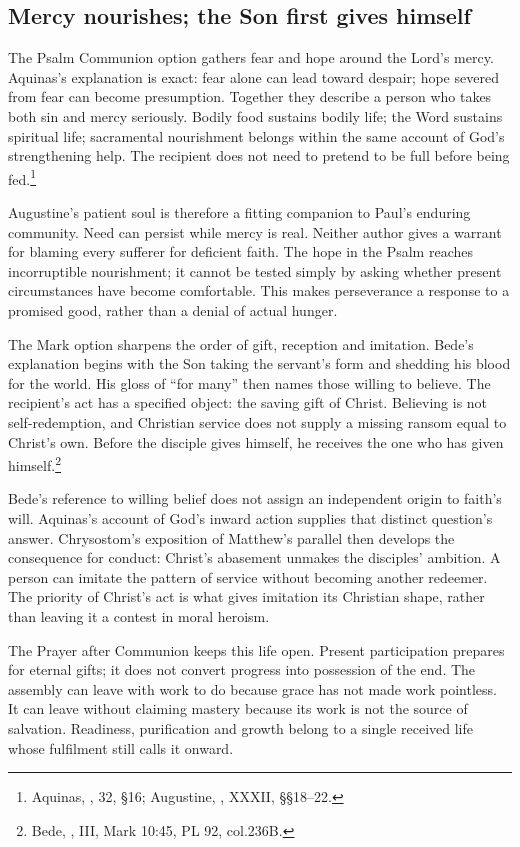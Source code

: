 \subsection{Mercy nourishes; the Son first gives himself}
The Psalm Communion option gathers fear and hope around the Lord's mercy. Aquinas's explanation is exact: fear alone can lead toward despair; hope severed from fear can become presumption. Together they describe a person who takes both sin and mercy seriously. Bodily food sustains bodily life; the Word sustains spiritual life; sacramental nourishment belongs within the same account of God's strengthening help. The recipient does not need to pretend to be full before being fed.\footnote{Aquinas, , 32, §16; Augustine, , XXXII, §§18--22.}

Augustine's patient soul is therefore a fitting companion to Paul's enduring community. Need can persist while mercy is real. Neither author gives a warrant for blaming every sufferer for deficient faith. The hope in the Psalm reaches incorruptible nourishment; it cannot be tested simply by asking whether present circumstances have become comfortable. This makes perseverance a response to a promised good, rather than a denial of actual hunger.

The Mark option sharpens the order of gift, reception and imitation. Bede's explanation begins with the Son taking the servant's form and shedding his blood for the world. His gloss of ``for many'' then names those willing to believe. The recipient's act has a specified object: the saving gift of Christ. Believing is not self-redemption, and Christian service does not supply a missing ransom equal to Christ's own. Before the disciple gives himself, he receives the one who has given himself.\footnote{Bede, , III, Mark 10:45, PL 92, col.236B.}

Bede's reference to willing belief does not assign an independent origin to faith's will. Aquinas's account of God's inward action supplies that distinct question's answer. Chrysostom's exposition of Matthew's parallel then develops the consequence for conduct: Christ's abasement unmakes the disciples' ambition. A person can imitate the pattern of service without becoming another redeemer. The priority of Christ's act is what gives imitation its Christian shape, rather than leaving it a contest in moral heroism.

The Prayer after Communion keeps this life open. Present participation prepares for eternal gifts; it does not convert progress into possession of the end. The assembly can leave with work to do because grace has not made work pointless. It can leave without claiming mastery because its work is not the source of salvation. Readiness, purification and growth belong to a single received life whose fulfilment still calls it onward.

